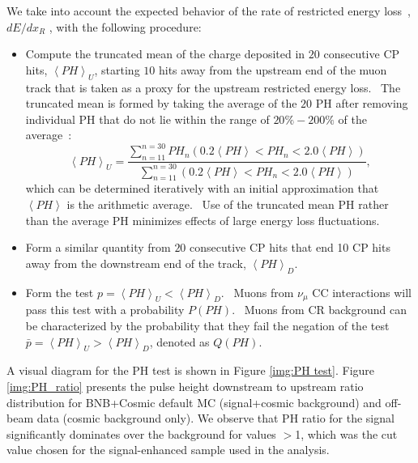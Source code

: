 \documentclass{article}
\begin{document}
We take into account the expected behavior of the rate of restricted energy loss~\cite{Particle Data Group}, $dE/dx_{R}$%
, with the following procedure:

\begin{itemize}
\item Compute the truncated mean of the charge deposited in $20$ consecutive CP hits, $\left\langle PH\right\rangle _{U}$, starting $10$ hits
away from the upstream end of the muon track that is taken as a proxy for the
upstream restricted energy loss. \ The truncated mean is formed by
taking the average of the $20$ PH after removing individual PH that do not
lie within the range of $20\%-200\%$ of the average~\cite{CCFR 20-200}:%
\begin{equation}
\left\langle PH\right\rangle _{U}=\frac{\sum\limits_{n=11}^{n=30}PH_{n}%
\left( 0.2\left\langle PH\right\rangle <PH_{n}<2.0\left\langle
PH\right\rangle \right) }{\sum\limits_{n=11}^{n=30}\left( 0.2\left\langle
PH\right\rangle <PH_{n}<2.0\left\langle PH\right\rangle \right) },
\end{equation}%
which can be determined iteratively with an initial approximation that $%
\left\langle PH\right\rangle $ is the arithmetic average. \ Use of the
truncated mean PH rather than the average PH minimizes effects of large
energy loss fluctuations. \ 

\item Form a similar quantity from $20$ consecutive CP hits that end 10 CP
hits away from the downstream end of the track, $\left\langle PH\right\rangle _{D}$.

\item Form the test $p=\left\langle PH\right\rangle _{U}<\left\langle
PH\right\rangle _{D}$. \ Muons from $\nu _{\mu }$ CC interactions will pass
this test with a probability $P\left( PH\right) $. \ Muons from CR
background can be characterized by the probability that they fail the
negation of the test $\bar{p}=\left\langle PH\right\rangle _{U}>\left\langle
PH\right\rangle _{D}$, denoted as $Q\left( PH\right) .$
\end{itemize}

A visual diagram for the PH test is shown in Figure \ref{img:PH test}.
Figure \ref{img:PH_ratio} presents the pulse height downstream to upstream
ratio distribution for BNB+Cosmic default MC (signal+cosmic background) and off-beam
data (cosmic background only). We observe that PH ratio for the signal
significantly dominates over the background for values $>$1, which was
the cut value chosen for the signal-enhanced sample used in the analysis.
\end{document}
